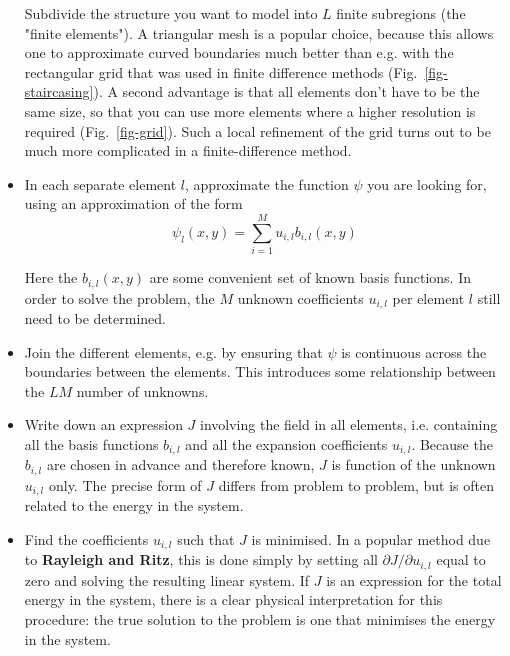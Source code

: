 \begin{itemize}
Subdivide the structure you want to model into $L$ finite subregions (the "finite elements"). A triangular mesh is a popular choice, because this allows one to approximate curved boundaries much better than e.g. with the rectangular grid that was used in finite difference methods (Fig.~\ref{fig-staircasing}). A second advantage is that all elements don't have to be the same size, so that you can use more elements where a higher resolution is required (Fig.~\ref{fig-grid}). Such a local refinement of the grid turns out to be much more complicated in a finite-difference method.
  
\item
In each separate element $l$, approximate the function $\psi$ you are looking for, using an approximation of the form
\begin{equation}
\psi_l(x,y) = \sum_{i=1}^M u_{i,l} b_{i,l}(x,y) \label{eq-fe-1}
\end{equation}

Here the $b_{i,l}(x,y)$ are some convenient set of known basis functions. In order to solve the problem, the $M$ unknown coefficients $u_{i,l}$ per element $l$ still need to be determined.

\item
Join the different elements, e.g. by ensuring that $\psi$ is continuous across the boundaries between the elements. This introduces some relationship between the $LM$ number of unknowns.


\item
Write down an expression $J$ involving the field in all elements, i.e. containing all the basis functions $b_{i,l}$ and all the expansion coefficients $u_{i,l}$. Because the  $b_{i,l}$ are chosen in advance and therefore known, $J$ is function of the unknown $u_{i,l}$ only. The precise form of $J$ differs from problem to problem, but is often related to the energy in the system.

\item
Find the coefficients $u_{i,l}$ such that $J$ is minimised. In a popular method due to \textbf{Rayleigh and Ritz}, this is done simply by setting all $\partial J / \partial u_{i,l}$ equal to zero and solving the resulting linear system. If $J$ is an expression for the total energy in the system, there is a clear physical interpretation for this procedure: the true solution to the problem is one that minimises the energy in the system.
\end{itemize}


\pagebreak


